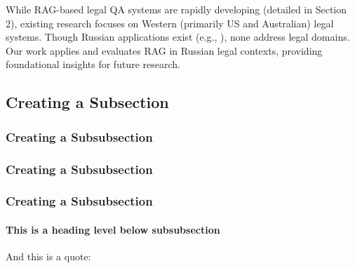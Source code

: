 While RAG-based legal QA systems are rapidly developing (detailed in Section 2), existing research focuses on Western (primarily US and Australian) legal systems. Though Russian applications exist (e.g., \cite{kolaScienceCenter}), none address legal domains. Our work applies and evaluates RAG in Russian legal contexts, providing foundational insights for future research.


\subsection{Creating a Subsection}
\label{sec:subsection}

\subsubsection{Creating a Subsubsection}
\subsubsection{Creating a Subsubsection}
\subsubsection{Creating a Subsubsection}

\paragraph{This is a heading level below subsubsection}

And this is a quote: 
%
\begin{quote}
\blindtext
\end{quote}

